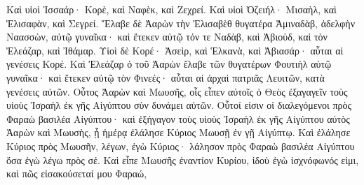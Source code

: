 {Καὶ υἱοὶ Ἰσσαάρ· Κορὲ, καὶ Ναφὲκ, καὶ Ζεχρεί.
Καὶ υἱοὶ Ὀζειήλ· Μισαὴλ, καὶ Ἐλισαφὰν, καὶ Σεγρεί.
Ἔλαβε δὲ Ἀαρὼν τὴν Ἐλισαβὲθ θυγατέρα Ἀμιναδὰβ, ἀδελφὴν Ναασσὼν, αὐτῷ γυναῖκα· καὶ ἔτεκεν αὐτῷ τόν τε Ναδὰβ, καὶ Ἀβιοὺδ, καὶ τὸν Ἐλεάζαρ, καὶ Ἰθάμαρ.
Υἱοὶ δὲ Κορέ· Ἀσεὶρ, καὶ Ἑλκανὰ, καὶ Ἀβιασάρ· αὗται αἱ γενέσεις Κορέ.
Καὶ Ἐλεάζαρ ὁ τοῦ Ἀαρὼν ἔλαβε τῶν θυγατέρων Φουτιὴλ αὐτῷ γυναῖκα· καὶ ἔτεκεν αὐτῷ τὸν Φινεές· αὗται αἱ ἀρχαὶ πατριᾶς Λευιτῶν, κατὰ γενέσεις αὐτῶν.
Οὗτος Ἀαρὼν καὶ Μωυσῆς, οἷς εἶπεν αὐτοῖς ὁ Θεὸς ἐξαγαγεῖν τοὺς υἱοὺς Ἰσραὴλ ἐκ γῆς Αἰγύπτου σὺν δυνάμει αὐτῶν.
Οὗτοί εἰσιν οἱ διαλεγόμενοι πρὸς Φαραὼ βασιλέα Αἰγύπτου· καὶ ἐξήγαγον τοὺς υἱοὺς Ἰσραὴλ ἐκ γῆς Αἰγύπτου αὐτὸς Ἀαρὼν καὶ Μωυσὴς,
ᾗ ἡμέρᾳ ἐλάλησε Κύριος Μωυσῇ ἐν γῇ Αἰγύπτῳ.
Καὶ ἐλάλησε Κύριος πρὸς Μωυσῆν, λέγων, ἐγὼ Κύριος· λάλησον πρὸς Φαραὼ βασιλέα Αἰγύπτου ὅσα ἐγὼ λέγω πρὸς σέ.
Καὶ εἶπε Μωυσῆς ἐναντίον Κυρίου, ἰδοὺ ἐγὼ ἰσχνόφωνός εἰμι, καὶ πῶς εἰσακούσεταί μου Φαραώ,

}
